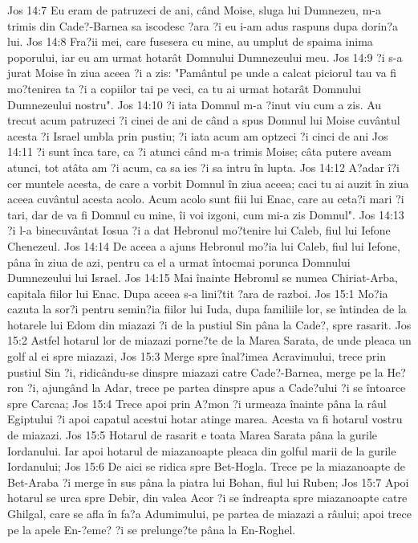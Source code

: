 Jos 14:7  Eu eram de patruzeci de ani, când Moise, sluga lui Dumnezeu, m-a trimis din Cade?-Barnea sa iscodesc ?ara ?i eu i-am adus raspuns dupa dorin?a lui.
Jos 14:8  Fra?ii mei, care fusesera cu mine, au umplut de spaima inima poporului, iar eu am urmat hotarât Domnului Dumnezeului meu.
Jos 14:9  ?i s-a jurat Moise în ziua aceea ?i a zis: "Pamântul pe unde a calcat piciorul tau va fi mo?tenirea ta ?i a copiilor tai pe veci, ca tu ai urmat hotarât Domnului Dumnezeului nostru".
Jos 14:10  ?i iata Domnul m-a ?inut viu cum a zis. Au trecut acum patruzeci ?i cinei de ani de când a spus Domnul lui Moise cuvântul acesta ?i Israel umbla prin pustiu; ?i iata acum am optzeci ?i cinci de ani
Jos 14:11  ?i sunt înca tare, ca ?i atunci când m-a trimis Moise; câta putere aveam atunci, tot atâta am ?i acum, ca sa ies ?i sa intru în lupta.
Jos 14:12  A?adar î?i cer muntele acesta, de care a vorbit Domnul în ziua aceea; caci tu ai auzit în ziua aceea cuvântul acesta acolo. Acum acolo sunt fiii lui Enac, care au ceta?i mari ?i tari, dar de va fi Domnul cu mine, îi voi izgoni, cum mi-a zis Domnul".
Jos 14:13  ?i l-a binecuvântat Iosua ?i a dat Hebronul mo?tenire lui Caleb, fiul lui Iefone Chenezeul.
Jos 14:14  De aceea a ajuns Hebronul mo?ia lui Caleb, fiul lui Iefone, pâna în ziua de azi, pentru ca el a urmat întocmai porunca Domnului Dumnezeului lui Israel.
Jos 14:15  Mai înainte Hebronul se numea Chiriat-Arba, capitala fiilor lui Enac. Dupa aceea s-a lini?tit ?ara de razboi.
Jos 15:1  Mo?ia cazuta la sor?i pentru semin?ia fiilor lui Iuda, dupa familiile lor, se întindea de la hotarele lui Edom din miazazi ?i de la pustiul Sin pâna la Cade?, spre rasarit.
Jos 15:2  Astfel hotarul lor de miazazi porne?te de la Marea Sarata, de unde pleaca un golf al ei spre miazazi,
Jos 15:3  Merge spre înal?imea Acravimului, trece prin pustiul Sin ?i, ridicându-se dinspre miazazi catre Cade?-Barnea, merge pe la He?ron ?i, ajungând la Adar, trece pe partea dinspre apus a Cade?ului ?i se întoarce spre Carcaa;
Jos 15:4  Trece apoi prin A?mon ?i urmeaza înainte pâna la râul Egiptului ?i apoi capatul acestui hotar atinge marea. Acesta va fi hotarul vostru de miazazi.
Jos 15:5  Hotarul de rasarit e toata Marea Sarata pâna la gurile Iordanului. Iar apoi hotarul de miazanoapte pleaca din golful marii de la gurile Iordanului;
Jos 15:6  De aici se ridica spre Bet-Hogla. Trece pe la miazanoapte de Bet-Araba ?i merge în sus pâna la piatra lui Bohan, fiul lui Ruben;
Jos 15:7  Apoi hotarul se urca spre Debir, din valea Acor ?i se îndreapta spre miazanoapte catre Ghilgal, care se afla în fa?a Adumimului, pe partea de miazazi a râului; apoi trece pe la apele En-?eme? ?i se prelunge?te pâna la En-Roghel.
